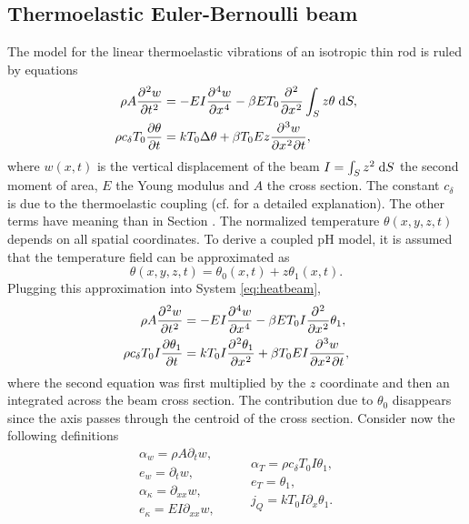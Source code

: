 \subsection{Thermoelastic Euler-Bernoulli beam}
The model for the linear thermoelastic vibrations of an isotropic thin rod is ruled by equations \cite{chadwick1962propagation,lifshitz2000thermoelastic}
\begin{equation}\label{eq:heatbeam}
\begin{aligned}
\rho A \diffp[2]{w}{t} &= - EI \diffp[4]{w}{x} - \beta E T_0 \diffp[2]{}{x} \int_{S} z \theta \d{S}, \\
\rho c_\delta T_0 \diffp{\theta}{t} &= k T_0 \Delta \theta + \beta T_0 E z \diffp[2,1]{w}{x,t}, 
\end{aligned}
\end{equation}
where $w(x,t)$ is the vertical displacement of the beam $I = \int_S z^2 \d{S}$ the second moment of area, $E$ the Young modulus and $A$ the cross section. The constant $c_\delta$ is due to the thermoelastic coupling (cf. \cite{lifshitz2000thermoelastic} for a detailed explanation).  The other terms have meaning than in Section . The normalized temperature $\theta(x,y,z,t)$ depends on all spatial coordinates. To derive a coupled pH model, it is assumed that the temperature field can be approximated as 
\begin{equation}
	\theta(x,y,z,t) = \theta_0(x,t) + z \theta_1(x,t).
\end{equation}
Plugging this approximation into System \eqref{eq:heatbeam}, 
\begin{equation}\label{eq:heatbeam2}
\begin{aligned}
\rho A \diffp[2]{w}{t} &= - EI \diffp[4]{w}{x} - \beta E T_0 I \diffp[2]{}{x} \theta_1, \\
\rho c_\delta T_0 I \diffp{\theta_1}{t} &= k T_0 I \diffp[2]{\theta_1}{x} + \beta T_0 E I \diffp[2,1]{w}{x,t},
\end{aligned}
\end{equation} 
where the second equation was first multiplied by the $z$ coordinate and then an integrated across the beam cross section. The contribution due to $\theta_0$ disappears since the axis passes through the centroid of the cross section. Consider now the following definitions
\begin{equation}
	\begin{aligned}
	\alpha_w = \rho A \partial_t w, \\
	e_w = \partial_t w, \\
	\alpha_\kappa = \partial_{xx} w, \\
	e_\kappa = EI \partial_{xx} w, \\
	\end{aligned} \qquad 
	\begin{aligned}
	\alpha_T = \rho c_\delta  T_0 I \theta_1, \\
	e_T = \theta_1, \\
	j_Q = k T_0 I \partial_x \theta_1.
	\end{aligned}
\end{equation}
